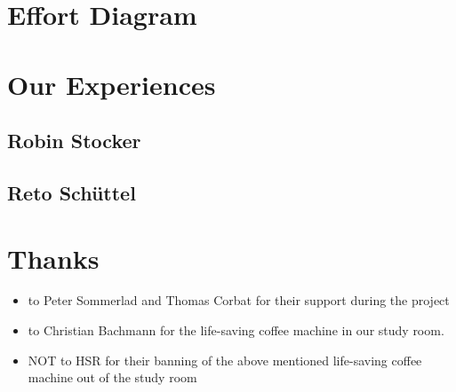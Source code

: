 \documentclass[12pt,halfparskip]{scrreprt}
\begin{document}
\clearpage

\section{Effort Diagram}

\clearpage

\section{Our Experiences}

\subsection{Robin Stocker}


\subsection{Reto Schüttel}


\section{Thanks}

\begin{itemize}
	\item to Peter Sommerlad and Thomas Corbat for their support during the project
	\item to Christian Bachmann for the life-saving coffee machine in our study room. 
	\item NOT to HSR for their banning of the above mentioned life-saving coffee machine out of the study room
\end{itemize}



\listoffigures



\end{document}
